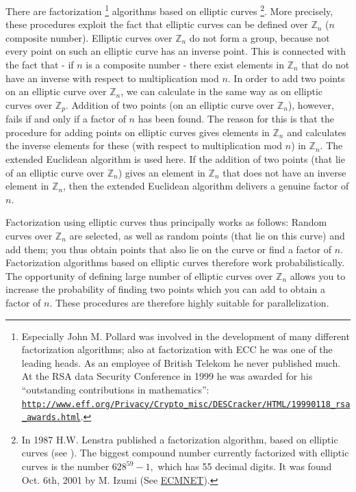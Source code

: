 There are factorization%
\footnote{Especially John M. Pollard  was involved
in the development of many different factorization algorithms; also at
factorization with ECC he was one of the leading heads. As an employee
of British Telekom he never published much. At the RSA data Security Conference
in 1999 he was awarded for his ``outstanding contributions in mathematics'':
\href{http://www.eff.org/Privacy/Crypto_misc/DESCracker/HTML/19990118_rsa_awards.html}
{\texttt{http://www.eff.org/Privacy/Crypto\_misc/DESCracker/HTML/19990118\_rsa\_awards.html}}.
}
algorithms based on elliptic curves%
\footnote{In 1987 H.W. Lenstra published
a factorization algorithm, based on elliptic curves (see \cite{ec:Lenstra1987}).
The biggest compound number currently 
factorized with elliptic curves is 
the number $ 628^{59}-1, $ which has 55 decimal digits. It was
found Oct. 6th, 2001 by M. Izumi 
(See \hyperlink{Lenstra2}{ECMNET}).
}. 
More precisely, these procedures exploit the fact that elliptic curves can
be defined over ${\mathbb Z}_n$ ($n$ composite number). Elliptic curves 
over ${\mathbb Z}_n$ do not form a group, because not every point on such 
an elliptic curve has an inverse point. This is connected with the fact 
that - if $n$ is a composite
number - there exist elements in ${\mathbb Z}_n$ that do not have an inverse
with respect to multiplication mod $n$. In order to add two points on an
elliptic curve over ${\mathbb Z}_n$, we can calculate in the same way as on
elliptic curves over ${\mathbb Z}_p$. Addition of two points (on an elliptic
curve over ${\mathbb Z}_n$), however, fails if and only if a factor of $n$ has
been found. The reason for this is that the procedure for adding points on
elliptic curves gives elements in ${\mathbb Z}_n$ and calculates the inverse
elements for these (with respect to multiplication mod $n$) in ${\mathbb Z}_n$.
The extended  Euclidean algorithm is used here. If
the addition of two points (that lie of an elliptic curve over ${\mathbb Z}_n$)
gives an element in ${\mathbb Z}_n$ that does not have an inverse element in
${\mathbb Z}_n$, then the extended Euclidean algorithm delivers a genuine factor
of $n$.

Factorization using elliptic curves thus principally works as follows: 
Random curves over ${\mathbb Z}_n$ are selected, as well as random points
(that lie on this curve) and add them; you thus obtain points that also
lie on the curve or find a factor of $n$. 
Factorization algorithms based on elliptic curves
therefore work probabilistically. The opportunity of defining large number of
elliptic curves over ${\mathbb Z}_n$ allows you to increase the probability of
finding two points which you can add to obtain a factor of $n$. These procedures
are therefore highly suitable for parallelization.


